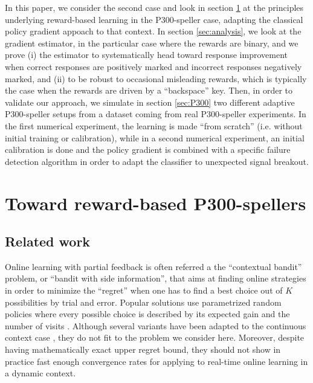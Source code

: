 \documentclass[conference]{IEEEtran}
\begin{document}
In this paper, we consider the second case and 
look in section \ref{sec:principles} at the principles underlying reward-based learning in the P300-speller case,
adapting the classical policy gradient appoach \cite{Wil92} to that context.
In section \ref{sec:analysis},  
we look at the gradient estimator, in the particular case where the rewards are binary, 
and we prove (i) the estimator to systematically head toward response improvement when correct responses are positively 
marked and incorrect responses negatively marked, and (ii) to be
robust to occasional misleading rewards, which is typically the case when the rewards are driven by a ``backspace'' key. 
Then, in order to validate our approach, 
we simulate in section \ref{sec:P300} two different adaptive P300-speller setups 
from a dataset coming from real P300-speller experiments.
In the first numerical experiment, the learning is made ``from scratch'' 
(i.e. without initial training or calibration), while in a second numerical experiment, 
an initial calibration is done and the policy
gradient is combined with a specific failure detection algorithm
in order to adapt the classifier to unexpected signal breakout.

\section{Toward reward-based P300-spellers}\label{sec:principles}

\subsection{Related work} 
Online learning with partial feedback is often referred a the ``contextual bandit'' problem, or
``bandit with side information'', that aims at finding online strategies in order to minimize the ``regret''  
when one has to find a best choice out of $K$ possibilities by trial and error. Popular solutions use
parametrized random policies where every possible choice is described by its expected gain and the number of visits
\cite{Auer02}. %
Although several variants have been adapted to the continuous context case \cite{Kakade08,Hazan11,Crammer11}, they  
do not fit to the problem we consider here.
Moreover, despite having mathematically exact upper regret bound, they should not show in practice fast enough convergence rates 
for applying to real-time online learning in a dynamic context.
\end{document}
